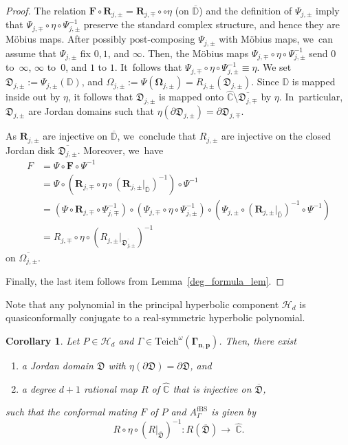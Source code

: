 \documentclass[JEP,XML,SOM,Unicode,NoFloatCountersInSection,published]{cedram}
\newtheorem{corollary}[lemma]{Corollary}
\theoremstyle{definition}
\theoremstyle{remark}
\newcommand{\C}{\mathbb{C}}
\newcommand{\D}{\mathbb{D}}
\begin{document}
\begin{proof}
The relation $\pmb{F}\circ\pmb{R}_{j,\pm}=\pmb{R}_{j,\mp}\circ\circ\eta$ (on $\overline{\D}$) and the definition of $\Psi_{j,\pm}$ imply that $\Psi_{j,\mp}\circ\eta\circ\Psi_{j,\pm}^{-1}$ preserve the standard complex structure, and hence they are Möbius maps. After possibly post-composing $\Psi_{j,\pm}$ with Möbius maps, we~can assume that $\Psi_{j,\pm}$ fix $0, 1$, and $\infty$. Then, the Möbius maps $\Psi_{j,\mp}\circ\eta\circ\Psi_{j,\pm}^{-1}$ send $0$ to~$\infty$, $\infty$ to~$0$, and $1$ to $1$. It~follows that $\Psi_{j,\mp}\circ\eta\circ\Psi_{j,\pm}^{-1}\equiv \eta$.
We set $\mathfrak{D}_{j,\pm}:=\Psi_{j,\pm}(\D)$, and $\Omega_{j,\pm}:=\Psi(\pmb{\Omega}_{j,\pm})= R_{j,\pm}(\mathfrak{D}_{j,\pm})$. Since $\D$ is mapped inside out by $\eta$, it follows that $\mathfrak{D}_{j,\pm}$ is mapped onto $\widehat{\C}\setminus\overline{\mathfrak{D}_{j,\mp}}$ by $\eta$. In~particular, $\mathfrak{D}_{j,\pm}$ are Jordan domains such that $\eta(\partial\mathfrak{D}_{j,\pm})=\partial\mathfrak{D}_{j,\mp}$.

As $\pmb{R}_{j,\pm}$ are injective on $\overline{\D}$, we~conclude that $R_{j,\pm}$ are injective on the closed Jordan disk $\overline{\mathfrak{D}_{j,\pm}}$. Moreover, we~have
\begin{align*}
F &= \Psi\circ\pmb{F}\circ\Psi^{-1}\\
&=\Psi\circ(\pmb{R}_{j,\mp}\circ\eta\circ(\pmb{R}_{j,\pm}\vert_{\overline{\D}})^{-1})\circ\Psi^{-1}\\
&= (\Psi\circ\pmb{R}_{j,\mp}\circ\Psi_{j,\mp}^{-1})\circ(\Psi_{j,\mp}\circ\eta\circ\Psi_{j,\pm}^{-1})\circ(\Psi_{j,\pm}\circ(\pmb{R}_{j,\pm}\vert_{\overline{\D}})^{-1}\circ\Psi^{-1})\\
&=R_{j,\mp}\circ\eta\circ (R_{j,\pm}\vert_{\overline{\mathfrak{D}_{j,\pm}}})^{-1}
\end{align*}
on $\overline{\Omega_{j,\pm}}$.

Finally, the last item follows from Lemma~\ref{deg_formula_lem}.
\end{proof}

Note that any polynomial in the principal hyperbolic component $\mathcal{H}_d$ is quasiconformally conjugate to a real-symmetric hyperbolic polynomial.

\begin{corollary}\label{main_hyp_comp_mating_class_cor}
Let $P\in\mathcal{H}_{d}$ and $\Gamma\in\mathrm{Teich}^\omega(\pmb{\Gamma_{n,p}})$. Then, there exist
\begin{enumerate}
\item a Jordan domain $\mathfrak{D}$ with $\eta(\partial\mathfrak{D})=\partial\mathfrak{D}$, and

\item a degree $d+1$ rational map $R$ of $\widehat{\C}$ that is injective on $\overline{\mathfrak{D}}$,
\end{enumerate}
such that the conformal mating $F$ of $P$ and $A_{\Gamma}^{\mathrm{fBS}}$ is given by
\[
R\circ\eta\circ (R\vert_{\overline{\mathfrak{D}}})^{-1}:R(\overline{\mathfrak{D}})\to~\widehat{\C}.
\]
\end{corollary}
\end{document}
